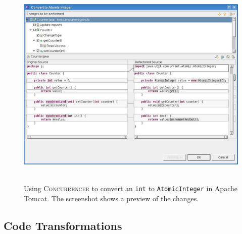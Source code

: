 \documentclass[10pt,twocolumn]{article}
\newcommand{\toolx}{{\smaller\textsc{Concurrencer}}\xspace}
\newenvironment{CodeOut}{\begin{scriptsize}}{\end{scriptsize}}
\newcommand{\codex}[1]{{\smaller\texttt{#1}}\xspace}
\newcommand{\FullWidth}{.95\columnwidth}
\begin{document}
 
\begin{figure}[tp]
  \includegraphics[width=\columnwidth]{./figs/ConvertToAtomicInteger}\
  \caption{Using \toolx to convert an \codex{int} to \codex{AtomicInteger} in Apache Tomcat.
The screenshot shows a preview of the changes.}
  \label{fig:CounterExample}
\end{figure}


\subsection{Code Transformations}
% 
%         
%         
%         
%  
%         
%         
%         
\end{document}
